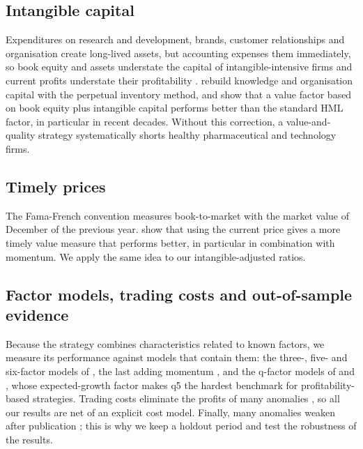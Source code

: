 \documentclass[12pt,a4paper]{article}
\begin{document}
\subsection{Intangible capital}

Expenditures on research and development, brands, customer relationships and organisation create
long-lived assets, but accounting expenses them immediately, so book equity and assets understate
the capital of intangible-intensive firms and current profits understate their profitability
\citep{LevSougiannis1996,ChanLakonishokSougiannis2001}. \citet{PetersTaylor2017} rebuild knowledge
and organisation capital with the perpetual inventory method, and
\citet{EisfeldtKimPapanikolaou2022} show that a value factor based on book equity plus intangible
capital performs better than the standard HML factor, in particular in recent decades. Without this
correction, a value-and-quality strategy systematically shorts healthy pharmaceutical and technology
firms.

\subsection{Timely prices}

The Fama-French convention measures book-to-market with the market value of December of the
previous year. \citet{AsnessFrazzini2013} show that using the current price gives a more timely
value measure that performs better, in particular in combination with momentum. We apply the same
idea to our intangible-adjusted ratios.

\subsection{Factor models, trading costs and out-of-sample evidence}

Because the strategy combines characteristics related to known factors, we measure its performance
against models that contain them: the three-, five- and six-factor models of
\citet{FamaFrench1993,FamaFrench2015,FamaFrench2018}, the last adding momentum
\citep{JegadeeshTitman1993,Carhart1997}, and the q-factor models of \citet{HouXueZhang2015} and
\citet{HouMoXueZhang2021}, whose expected-growth factor makes q5 the hardest benchmark for
profitability-based strategies. Trading costs eliminate the profits of many anomalies
\citep{NovyMarxVelikov2016}, so all our results are net of an explicit cost model. Finally, many
anomalies weaken after publication \citep{McLeanPontiff2016,HarveyLiuZhu2016}; this is why we keep a
holdout period and test the robustness of the results.
\end{document}
